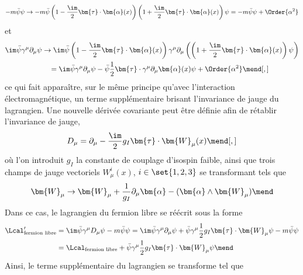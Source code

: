 \begin{equation}
-m\bar{\psi}\psi
\to
-m\bar{\psi}\left(1-\frac{\im}{2}\bm{\tau}\cdot\bm{\alpha}(x)\right)\left(1+\frac{\im}{2}\bm{\tau}\cdot\bm{\alpha}(x)\right)\psi
=-m\bar{\psi}\psi+\Order{\alpha^2}
\end{equation}
et
\begin{align}
\im\bar{\psi} \gamma^\mu\partial_\mu \psi
&
\to
\im \bar{\psi}\left(1-\frac{\im}{2}\bm{\tau}\cdot\bm{\alpha}(x)\right)\gamma^\mu\partial_\mu \left(\left(1+\frac{\im}{2}\bm{\tau}\cdot\bm{\alpha}(x)\right)\psi\right)
\nonumber\\&\hphantom{\to}
=
\im \bar{\psi}\gamma^\mu\partial_\mu \psi
-
\bar{\psi}\frac{1}{2}\bm{\tau}\cdot\gamma^\mu\partial_\mu\bm{\alpha}(x) \psi+\Order{\alpha^2}
\mend[,]
\label{eq-chapter-MS-MSSM-section-formalisme-subsec-EW-tr_jauge-terme_cinetique}
\end{align}
ce qui fait apparaître, sur le même principe qu'avec l'interaction électromagnétique, un terme supplémentaire brisant l'invariance de jauge du lagrangien.
Une nouvelle dérivée covariante peut être définie afin de rétablir l'invariance de jauge,
\begin{equation}
D_\mu  = \partial_\mu  - \frac{\im}{2} g_I \bm{\tau}\cdot\bm{W}_\mu(x)
\mend[,]
\end{equation}
où l'on introduit $g_I$ la constante de couplage d'isospin faible, ainsi que trois champs de jauge vectoriels $W^i_\mu(x)$, $i\in\set{1,2,3}$ se transformant tels que
\begin{equation}
\bm{W}_\mu \to \bm{W}_\mu + \frac{1}{g_I}\partial_\mu\bm{\alpha} - (\bm{\alpha}\wedge\bm{W}_\mu)
\mend
\end{equation}
Dans ce cas, le lagrangien du fermion libre se réécrit sous la forme
\begin{align}
\Lcal_{\text{fermion libre}}'
&
= \im \bar{\psi} \gamma^\mu D_\mu \psi - m \bar{\psi}\psi
= \im \bar{\psi} \gamma^\mu \partial_\mu \psi + \bar{\psi} \gamma^\mu \frac{1}{2} g_I \bm{\tau}\cdot\bm{W}_\mu \psi - m \bar{\psi}\psi
\nonumber
\\&
=
\Lcal_{\text{fermion libre}}
+
\bar{\psi} \gamma^\mu \frac{1}{2} g_I \bm{\tau}\cdot\bm{W}_\mu \psi
\mend
\end{align}
Ainsi, le terme supplémentaire du lagrangien se transforme tel que
